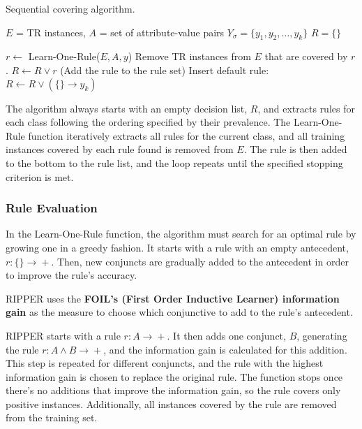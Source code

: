 \begin{algorithm}
\caption{Sequential covering algorithm.}
\begin{algorithmic}[1]
    \State $E$ = TR instances, $A$ = set of attribute-value pairs
    \State $Y_{\sigma} = \{y_1, y_2, \dots , y_k\}$
    \State $R = \{ \}$

            \State $r \leftarrow{}$ Learn-One-Rule($E,A,y$)
            \State Remove TR instances from $E$ that are covered by $r$.
            \State $R \leftarrow{} R \lor r$ (Add the rule to the rule set)
        \EndWhile
    \EndFor
    \State Insert default rule: $R \leftarrow{} R \lor (\{\} \rightarrow{} y_k)$
\end{algorithmic}
\end{algorithm}

The algorithm always starts with an empty decision list, $R$, and extracts rules for each class following the ordering specified by their prevalence. The Learn-One-Rule function iteratively extracts all rules for the current class, and all training instances covered by each rule found is removed from $E$. The rule is then added to the bottom to the rule list, and the loop repeats until the specified stopping criterion is met.

\subsubsection{Rule Evaluation}

In the Learn-One-Rule function, the algorithm must search for an optimal rule by growing one in a greedy fashion. It starts with a rule with an empty antecedent, $r : \{ \} \rightarrow{} +$. Then, new conjuncts are gradually added to the antecedent in order to improve the rule's accuracy.

RIPPER uses the \textbf{FOIL's (First Order Inductive Learner) information gain} as the measure to choose which conjunctive to add to the rule's antecedent.

RIPPER starts with a rule $r : A \rightarrow{} +$. It then adds one conjunct, $B$, generating the rule $r : A \land B \rightarrow{} +$, and the information gain is calculated for this addition. This step is repeated for different conjuncts, and the rule with the highest information gain is chosen to replace the original rule. The function stops once there's no additions that improve the information gain, so the rule covers only positive instances. Additionally, all instances covered by the rule are removed from the training set.

